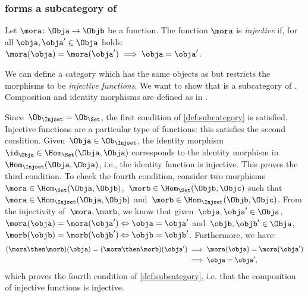 \subsubsection{\Injset forms a subcategory of \Set}
\begin{definition}
\label{def:injective-function}
Let $\mora \colon \Obja\to \Objb$ be a function. The function $\mora$ is \emph{injective} if, for all $\obja,\obja'\in \Obja$ holds: $\mora(\obja)=\mora(\obja')\implies \obja=\obja'$.
\end{definition}


\begin{example}
We can define a category \Injset which has the same objects as \Set but restricts the morphisms to be \emph{injective functions}.
We want to show that \Injset is a subcategory of \Set. Composition and identity morphisms are defined as in \Set.

Since~$\Ob_{\Injset}=\Ob_{\Set}$, the first condition of \cref{def:subcategory} is satisfied. Injective functions are a particular type of functions: this satisfies the second condition. Given~$\Obja\in \Ob_{\Injset}$, the identity morphism~$\id_\Obja\in \Hom_{\Set}(\Obja,\Obja)$ corresponds to the identity morphism in~$\Hom_{\Injset}(\Obja,\Obja)$, i.e., the identity function is injective. This proves the third condition. To check the fourth condition, consider two morphisms~$\mora \in \Hom_\Set(\Obja,\Objb)$,~$\morb \in \Hom_\Set(\Objb,\Objc)$ such that~$\mora \in \Hom_\Injset(\Obja,\Objb)$ and~$\morb\in \Hom_\Injset(\Objb,\Objc)$. From the injectivity of~$\mora,\morb$, we know that given~$\obja,\obja'\in \Obja$, $\mora(\obja)=\mora(\obja') \Leftrightarrow \obja=\obja'$ and~$\objb,\objb'\in \Obja$,~$\morb(\objb)=\morb(\objb') \Leftrightarrow \objb=\objb'$. Furthermore, we have:
\begin{equation*}
    \begin{aligned}
    (\mora\then \morb)(\obja)=(\mora \then \morb)(\obja')&\implies \mora(\obja)=\mora(\obja')\\
    &\implies \obja=\obja',
    \end{aligned}
\end{equation*}
which proves the fourth condition of \cref{def:subcategory}, i.e. that the composition of injective functions is injective.
\end{example}



